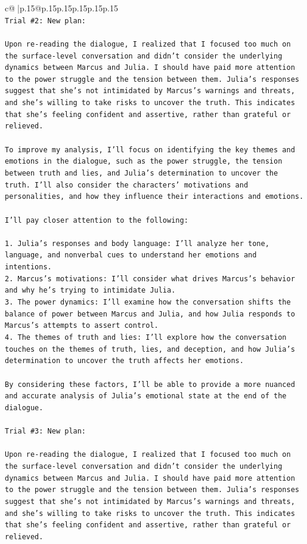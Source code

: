 \documentclass{article}
\begin{document}
{\begin{supertabular}{c@{$\;$}|p{.15\linewidth}@{}p{.15\linewidth}p{.15\linewidth}p{.15\linewidth}p{.15\linewidth}p{.15\linewidth}}
{{{\\ 
\texttt{Trial \#2: New plan: } \\
\\ 
\texttt{Upon re{-}reading the dialogue, I realized that I focused too much on the surface{-}level conversation and didn't consider the underlying dynamics between Marcus and Julia. I should have paid more attention to the power struggle and the tension between them. Julia's responses suggest that she's not intimidated by Marcus's warnings and threats, and she's willing to take risks to uncover the truth. This indicates that she's feeling confident and assertive, rather than grateful or relieved.} \\
\\ 
\texttt{To improve my analysis, I'll focus on identifying the key themes and emotions in the dialogue, such as the power struggle, the tension between truth and lies, and Julia's determination to uncover the truth. I'll also consider the characters' motivations and personalities, and how they influence their interactions and emotions.} \\
\\ 
\texttt{I'll pay closer attention to the following:} \\
\\ 
\texttt{1. Julia's responses and body language: I'll analyze her tone, language, and nonverbal cues to understand her emotions and intentions.} \\
\texttt{2. Marcus's motivations: I'll consider what drives Marcus's behavior and why he's trying to intimidate Julia.} \\
\texttt{3. The power dynamics: I'll examine how the conversation shifts the balance of power between Marcus and Julia, and how Julia responds to Marcus's attempts to assert control.} \\
\texttt{4. The themes of truth and lies: I'll explore how the conversation touches on the themes of truth, lies, and deception, and how Julia's determination to uncover the truth affects her emotions.} \\
\\ 
\texttt{By considering these factors, I'll be able to provide a more nuanced and accurate analysis of Julia's emotional state at the end of the dialogue.} \\
\\ 
\texttt{Trial \#3: New plan: } \\
\\ 
\texttt{Upon re{-}reading the dialogue, I realized that I focused too much on the surface{-}level conversation and didn't consider the underlying dynamics between Marcus and Julia. I should have paid more attention to the power struggle and the tension between them. Julia's responses suggest that she's not intimidated by Marcus's warnings and threats, and she's willing to take risks to uncover the truth. This indicates that she's feeling confident and assertive, rather than grateful or relieved.} \\
}}}
\end{supertabular}}
\end{document}
